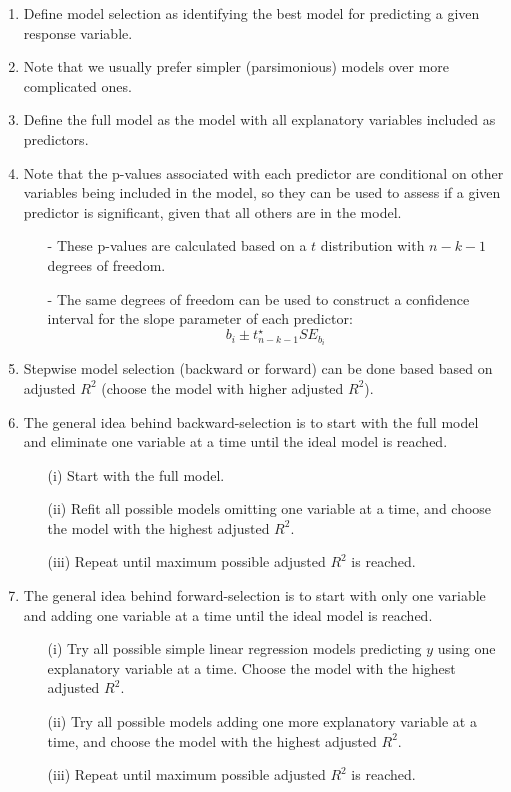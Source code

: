 \documentclass[11pt]{article}
\begin{document}
%
\begin{enumerate}[resume]
\renewcommand\labelenumi{\textcolor{light}{\textbf{LO \theenumi.}}}

\item Define model selection as identifying the best model for predicting a given response variable. 

\item Note that we usually prefer simpler (parsimonious) models over more complicated ones.

\item Define the full model as the model with all explanatory variables included as predictors.

\item Note that the p-values associated with each predictor are conditional on other variables being included in the model, so they can be used to assess if a given predictor is significant, given that all others are in the model.
\begin{itemize}
\item[-] These p-values are calculated based on a $t$ distribution with $n - k - 1$ degrees of freedom.
\item[-] The same degrees of freedom can be used to construct a confidence interval for the slope parameter of each predictor:
\[ b_i \pm t^\star_{n - k - 1} SE_{b_i} \]
\end{itemize}

\item Stepwise model selection (backward or forward) can be done based based on adjusted $R^2$ (choose the model with higher adjusted $R^2$).

\item The general idea behind backward-selection is to start with the full model and eliminate one variable at a time until the ideal model is reached.
\begin{enumerate}
\item[(i)] Start with the full model.
\item[(ii)] Refit all possible models omitting one variable at a time, and choose the model with the highest adjusted $R^2$.
\item[(iii)] Repeat until maximum possible adjusted $R^2$ is reached.
\end{enumerate}

\item The general idea behind forward-selection is to start with only one variable and adding one variable at a time until the ideal model is reached.
\begin{enumerate}
\item[(i)] Try all possible simple linear regression models predicting $y$ using one explanatory variable at a time. Choose the model with the highest adjusted $R^2$.
\item[(ii)] Try all possible models adding one more explanatory variable at a time, and choose the model with the highest adjusted $R^2$.
\item[(iii)] Repeat until maximum possible adjusted $R^2$ is reached.
\end{enumerate}


\end{enumerate}
\end{document}
